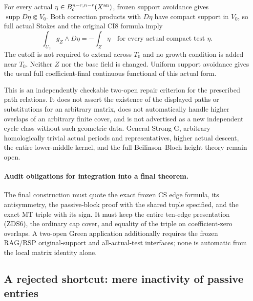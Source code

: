 For every actual $\eta\in B_c^{n-r,n-r}(X^{\rm an})$, frozen
support avoidance gives $\operatorname{supp}D\eta\Subset V_0$.
Both correction products with $D\eta$ have compact support in
$V_0$, so full actual Stokes and the original CI8 formula imply
\[
 \boxed{\qquad\int_{U_0}g_Z\wedge D\eta=-\int_Z\eta
       \quad\text{for every actual compact test }\eta.\qquad}
 \tag{ZDS46}
\]
The cutoff is not required to extend across $T_0$ and no growth
condition is added near $T_0$.  Neither $Z$ nor the base field is
changed.  Uniform support avoidance gives the usual full
coefficient-final continuous functional of this actual form.

This is an independently checkable two-open repair criterion for
the prescribed path relations.  It does not assert the existence
of the displayed paths or substitutions for an arbitrary matrix,
does not automatically handle higher overlaps of an arbitrary
finite cover, and is not advertised as a new independent cycle
class without such geometric data.  General Strong G, arbitrary
homologically trivial actual periods and representatives, higher
actual descent, the entire lower-middle kernel, and the full
Beilinson--Bloch height theory remain open.

\paragraph{Audit obligations for integration into a final theorem.}
The final construction must quote the exact frozen CS edge formula,
its antisymmetry, the passive-block proof with the shared tuple
specified, and the exact MT triple with its sign.  It must keep
the entire ten-edge presentation (ZDS6), the ordinary cap cover,
and equality of the triple on coefficient-zero overlaps.  A
two-open Green application additionally requires the frozen
RAG/RSP original-support and all-actual-test interfaces; none is
automatic from the local matrix identity alone.

\subsection{A rejected shortcut: mere inactivity of passive entries}

